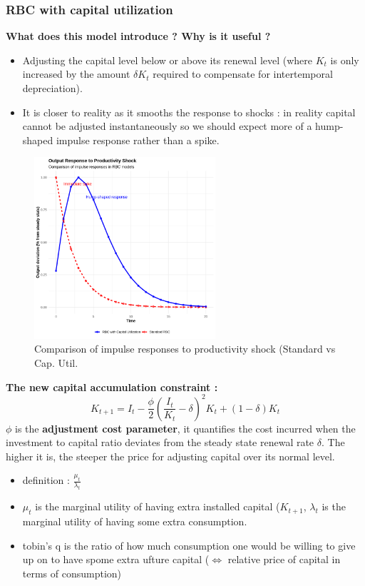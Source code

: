 \documentclass{article}
\begin{document}
\subsubsection{RBC with capital utilization}
\textbf{What does this model introduce ? Why is it useful ? }
\begin{itemize}
    \item Adjusting the capital level below or above its renewal level (where $K_t$ is only increased by the amount $\delta K_t$ required to compensate for intertemporal depreciation). 
    \item It is closer to reality as it smooths the response to shocks : in reality capital cannot be adjusted instantaneously so we should expect more of a hump-shaped impulse response rather than a spike. 
\end{itemize}
\begin{figure}[H]
    \centering
    \includegraphics[width=0.6\textwidth]{Pictures/hump_graph.png}
    \caption{Comparison of impulse responses to productivity shock (Standard vs Cap. Util.}
    \label{fig: Comparison impulse response : standard vs cap. util.}
\end{figure}
\textbf{The new capital accumulation constraint : }
\begin{equation}
    K_{t+1}=I_t-\frac{\phi}{2}(\frac{I_t}{K_t}-\delta)^2K_t + (1-\delta)K_t
\end{equation}
$\phi$ is the \textbf{adjustment cost parameter}, it quantifies the cost incurred when the investment to capital ratio deviates from the steady state renewal rate $\delta$. The higher it is, the steeper the price for adjusting capital over its normal level. 

\begin{tobinsbox}
\begin{itemize}
    \item definition : $\frac{\mu_t}{\lambda_t}$
    \item $\mu_t$ is the marginal utility of having extra installed capital ($K_{t+1}$, $\lambda_t$ is the marginal utility of having some extra consumption. 
    \item tobin's q is the ratio of how much consumption one would be willing to give up on to have spome extra ufture capital ($\Longleftrightarrow$ relative price of capital in terms of consumption)
\end{itemize}   
\end{tobinsbox}
\end{document}
